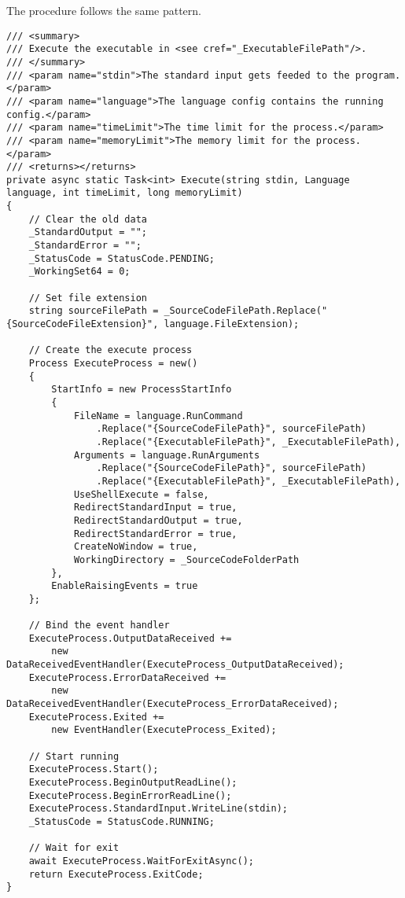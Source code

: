\documentclass[report.tex]{subfiles}
\begin{document}
The  procedure follows the same pattern.

\begin{verbatim}
/// <summary>
/// Execute the executable in <see cref="_ExecutableFilePath"/>.
/// </summary>
/// <param name="stdin">The standard input gets feeded to the program.</param>
/// <param name="language">The language config contains the running config.</param>
/// <param name="timeLimit">The time limit for the process.</param>
/// <param name="memoryLimit">The memory limit for the process.</param>
/// <returns></returns>
private async static Task<int> Execute(string stdin, Language language, int timeLimit, long memoryLimit)
{
    // Clear the old data
    _StandardOutput = "";
    _StandardError = "";
    _StatusCode = StatusCode.PENDING;
    _WorkingSet64 = 0;

    // Set file extension
    string sourceFilePath = _SourceCodeFilePath.Replace("{SourceCodeFileExtension}", language.FileExtension);

    // Create the execute process
    Process ExecuteProcess = new()
    {
        StartInfo = new ProcessStartInfo
        {
            FileName = language.RunCommand
                .Replace("{SourceCodeFilePath}", sourceFilePath)
                .Replace("{ExecutableFilePath}", _ExecutableFilePath),
            Arguments = language.RunArguments
                .Replace("{SourceCodeFilePath}", sourceFilePath)
                .Replace("{ExecutableFilePath}", _ExecutableFilePath),
            UseShellExecute = false,
            RedirectStandardInput = true,
            RedirectStandardOutput = true,
            RedirectStandardError = true,
            CreateNoWindow = true,
            WorkingDirectory = _SourceCodeFolderPath
        },
        EnableRaisingEvents = true
    };

    // Bind the event handler
    ExecuteProcess.OutputDataReceived +=
        new DataReceivedEventHandler(ExecuteProcess_OutputDataReceived);
    ExecuteProcess.ErrorDataReceived +=
        new DataReceivedEventHandler(ExecuteProcess_ErrorDataReceived);
    ExecuteProcess.Exited +=
        new EventHandler(ExecuteProcess_Exited);

    // Start running
    ExecuteProcess.Start();
    ExecuteProcess.BeginOutputReadLine();
    ExecuteProcess.BeginErrorReadLine();
    ExecuteProcess.StandardInput.WriteLine(stdin);
    _StatusCode = StatusCode.RUNNING;

    // Wait for exit
    await ExecuteProcess.WaitForExitAsync();
    return ExecuteProcess.ExitCode;
}
\end{verbatim}
\end{document}
